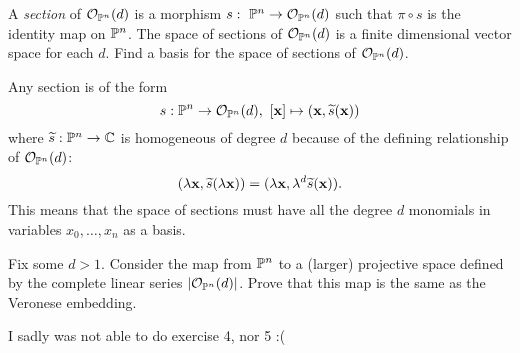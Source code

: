 \documentclass[12pt]{memoir}
\begin{document}
 \begin{Ej}
    A \emph{section} of $\mathcal{O}_{\mathbb{P}^n}(d)$ is a morphism $s:\ \mathbb{P}^n \to  \mathcal{O}_{\mathbb{P}^n}(d)$ such that $\pi\circ s$ is the identity
map on $\mathbb{P}^n$. The space of sections of $\mathcal{O}_{\mathbb{P}^n}(d)$ is a finite dimensional vector space for
each $d$. Find a basis for the space of sections of $\mathcal{O}_{\mathbb{P}^n}(d)$.
 \end{Ej}

 \begin{ptcbr}
    Any section is of the form 
    $$s:\bP^n\to\cO_{\bP^n}(d),\ [\vec{x}]\mapsto(\vec{x},\widetilde{s}(\vec{x}))$$
    where $\widetilde{s}:\mathbb{P}^n\to\mathbb{C}$ is homogeneous of degree $d$ because of the defining relationship of $\mathcal{O}_{\mathbb{P}^n}(d)$:
    $$(\lambda\mathbf{x},\widetilde{s}(\lambda \mathbf{x}))=(\lambda\mathbf{x},\lambda^d\widetilde{s}(\mathbf{x})).$$
    This means that the space of sections must have all the degree $d$ monomials in variables $x_0,\dots,x_n$ as a basis. 
 \end{ptcbr}

 \begin{Ej}
    Fix some $d > 1$. Consider the map from $\mathbb{P}^n$ to a (larger)
projective space defined by the complete linear series
$|\mathcal{O}_{\mathbb{P}^n}(d)|$. Prove that this map is the same as the Veronese embedding.
 \end{Ej}

 \begin{ptcbr}
   
 \end{ptcbr}
I sadly was not able to do exercise 4, nor 5 :(
\end{document}
